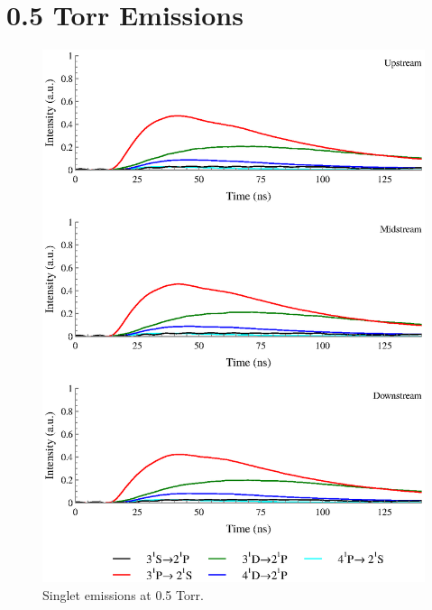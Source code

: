 \section{0.5 Torr Emissions}
\begin{figure}
  \centering
  \includegraphics{./chapters/extraem/figures/05torr_s.eps}
  \caption{Singlet emissions at 0.5 Torr.}
\end{figure}

